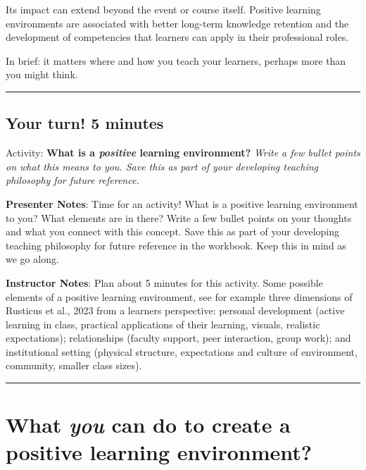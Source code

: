 \documentclass[
  letterpaper,
  DIV=11,
  numbers=noendperiod]{scrartcl}
\begin{document}
Its impact can extend beyond the event or course itself. Positive
learning environments are associated with better long-term knowledge
retention and the development of competencies that learners can apply in
their professional roles.

In brief: it matters where and how you teach your learners, perhaps more
than you might think.

\begin{center}\rule{0.5\linewidth}{0.5pt}\end{center}

\subsection{Your turn! 5 minutes}\label{your-turn-5-minutes}

Activity: \textbf{What is a \emph{positive} learning environment?}
\emph{Write a few bullet points on what this means to you. Save this as
part of your developing teaching philosophy for future reference.}

\textbf{Presenter Notes}: Time for an activity! What is a positive
learning environment to you? What elements are in there? Write a few
bullet points on your thoughts and what you connect with this concept.
Save this as part of your developing teaching philosophy for future
reference in the workbook. Keep this in mind as we go along.

\textbf{Instructor Notes}: Plan about 5 minutes for this activity. Some
possible elements of a positive learning environment, see for example
three dimensions of Rusticus et al., 2023 from a learners perspective:
personal development (active learning in class, practical applications
of their learning, visuals, realistic expectations); relationships
(faculty support, peer interaction, group work); and institutional
setting (physical structure, expectations and culture of environment,
community, smaller class sizes).

\begin{center}\rule{0.5\linewidth}{0.5pt}\end{center}

\section{\texorpdfstring{What \emph{you} can do to create a positive
learning
environment?}{What you can do to create a positive learning environment?}}\label{what-you-can-do-to-create-a-positive-learning-environment}
\end{document}
